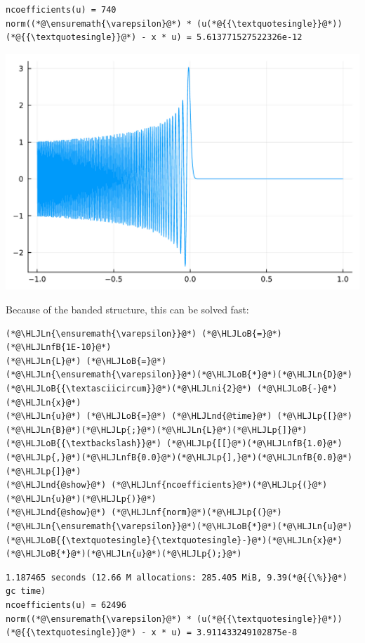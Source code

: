 \documentclass[12pt,a4paper]{article}
\newcommand{\HLJLn}[1]{#1}
\newcommand{\HLJLnd}[1]{\textcolor[RGB]{214,102,97}{#1}}
\newcommand{\HLJLnf}[1]{\textcolor[RGB]{66,102,213}{#1}}
\newcommand{\HLJLnfB}[1]{\textcolor[RGB]{59,151,46}{#1}}
\newcommand{\HLJLni}[1]{\textcolor[RGB]{59,151,46}{#1}}
\newcommand{\HLJLoB}[1]{\textcolor[RGB]{102,102,102}{\textbf{#1}}}
\newcommand{\HLJLp}[1]{#1}
\begin{document}
\begin{lstlisting}
ncoefficients(u) = 740
norm((*@\ensuremath{\varepsilon}@*) * (u(*@{{\textquotesingle}}@*))(*@{{\textquotesingle}}@*) - x * u) = 5.613771527522326e-12
\end{lstlisting}

\includegraphics[width=\linewidth]{jl_GsbqQZ/Chapter4_35_1.pdf}

Because of the banded structure, this can be solved fast:


\begin{lstlisting}
(*@\HLJLn{\ensuremath{\varepsilon}}@*) (*@\HLJLoB{=}@*) (*@\HLJLnfB{1E-10}@*)
(*@\HLJLn{L}@*) (*@\HLJLoB{=}@*) (*@\HLJLn{\ensuremath{\varepsilon}}@*)(*@\HLJLoB{*}@*)(*@\HLJLn{D}@*)(*@\HLJLoB{{\textasciicircum}}@*)(*@\HLJLni{2}@*) (*@\HLJLoB{-}@*) (*@\HLJLn{x}@*)
(*@\HLJLn{u}@*) (*@\HLJLoB{=}@*) (*@\HLJLnd{@time}@*) (*@\HLJLp{[}@*)(*@\HLJLn{B}@*)(*@\HLJLp{;}@*)(*@\HLJLn{L}@*)(*@\HLJLp{]}@*) (*@\HLJLoB{{\textbackslash}}@*) (*@\HLJLp{[[}@*)(*@\HLJLnfB{1.0}@*)(*@\HLJLp{,}@*)(*@\HLJLnfB{0.0}@*)(*@\HLJLp{],}@*)(*@\HLJLnfB{0.0}@*)(*@\HLJLp{]}@*)
(*@\HLJLnd{@show}@*) (*@\HLJLnf{ncoefficients}@*)(*@\HLJLp{(}@*)(*@\HLJLn{u}@*)(*@\HLJLp{)}@*)
(*@\HLJLnd{@show}@*) (*@\HLJLnf{norm}@*)(*@\HLJLp{(}@*)(*@\HLJLn{\ensuremath{\varepsilon}}@*)(*@\HLJLoB{*}@*)(*@\HLJLn{u}@*)(*@\HLJLoB{{\textquotesingle}{\textquotesingle}-}@*)(*@\HLJLn{x}@*)(*@\HLJLoB{*}@*)(*@\HLJLn{u}@*)(*@\HLJLp{);}@*)
\end{lstlisting}

\begin{lstlisting}
1.187465 seconds (12.66 M allocations: 285.405 MiB, 9.39(*@{{\%}}@*) gc time)
ncoefficients(u) = 62496
norm((*@\ensuremath{\varepsilon}@*) * (u(*@{{\textquotesingle}}@*))(*@{{\textquotesingle}}@*) - x * u) = 3.911433249102875e-8
\end{lstlisting}
\end{document}
